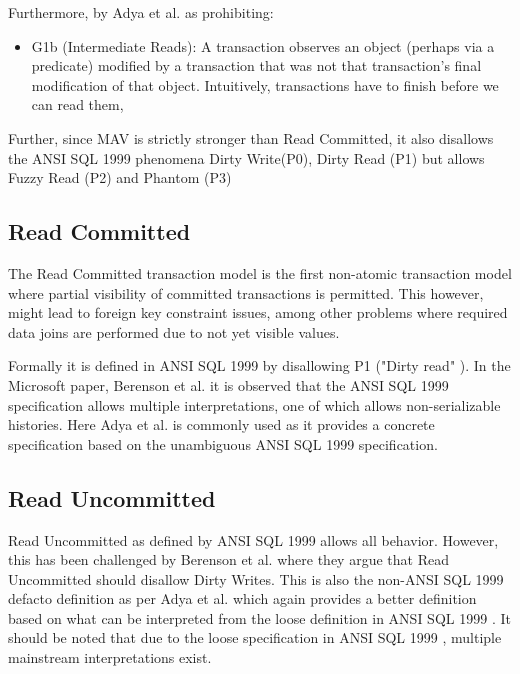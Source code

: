 \documentclass[a4paper,10pt,titlepage]{report}
\begin{document}
Furthermore, by Adya et al. \cite{Adya99weakconsistency} as prohibiting:
\begin{itemize}
    \item G1b (Intermediate Reads): A transaction observes an object (perhaps via a predicate) modified by a transaction that was not that transaction's final modification of that object. Intuitively, transactions have to finish before we can read them,
\end{itemize}

Further, since MAV is strictly stronger than Read Committed, it also disallows the ANSI SQL 1999 \cite{ansisql1999} phenomena Dirty Write(P0), Dirty Read (P1) but allows Fuzzy Read (P2) and Phantom (P3)

\subsection{Read Committed}
The Read Committed transaction model is the first non-atomic transaction model where partial visibility of committed transactions is permitted. This however, might lead to foreign key constraint issues, among other problems where required data joins are performed due to not yet visible values.
\\ \vspace{5mm}

Formally it is defined in ANSI SQL 1999 \cite{ansisql1999} by disallowing P1 ("Dirty read" ). In the Microsoft paper, Berenson et al. \cite{Berensonetal} it is observed that the ANSI SQL 1999\cite{ansisql1999} specification allows multiple interpretations, one of which allows non-serializable histories. Here Adya et al. \cite{Adya99weakconsistency} is commonly used as it provides a concrete specification based on the unambiguous ANSI SQL 1999 \cite{ansisql1999} specification.
\\ \vspace{5mm}


\subsection{Read Uncommitted}
Read Uncommitted as defined by ANSI SQL 1999 \cite{ansisql1999} allows all behavior. However, this has been challenged by Berenson et al. \cite{Berensonetal} where they argue that Read Uncommitted should disallow Dirty Writes. This is also the non-ANSI SQL 1999 \cite{ansisql1999} defacto definition as per Adya et al. \cite{Adya99weakconsistency} which again provides a better definition based on what can be interpreted from the loose definition in ANSI SQL 1999 \cite{ansisql1999}. It should be noted that due to the loose specification in ANSI SQL 1999 \cite{ansisql1999}, multiple mainstream interpretations exist.\\
\end{document}

